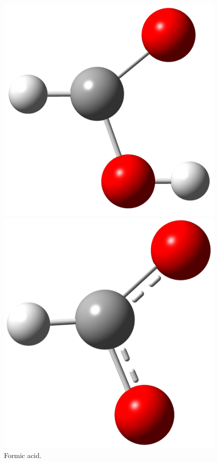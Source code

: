 \documentclass[twocolumn]{article}
\begin{document}
    \begin{figure}[h!]
        \centering
        \begin{minipage}[b]{0.225\textwidth}
            \centering
          \includegraphics[scale=0.05]{formicAcid.jpg}
          \caption{Formic acid.}
        \end{minipage}
        \hfill
        \begin{minipage}[b]{0.225\textwidth}
          \centering
          \includegraphics[scale=0.05]{formeate.jpg}

\end{minipage}
\end{figure}
\end{document}
